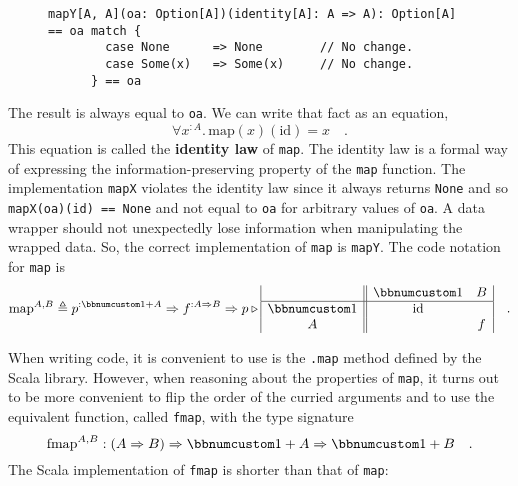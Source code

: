 \begin{wrapfigure}{l}{0.65\columnwidth}%
\vspace{-0.8\baselineskip}
\begin{lstlisting}
mapY[A, A](oa: Option[A])(identity[A]: A => A): Option[A]
== oa match {
        case None      => None        // No change.
        case Some(x)   => Some(x)     // No change.
      } == oa
\end{lstlisting}
\vspace{-1.3\baselineskip}
\end{wrapfigure}%
The result is always equal to \lstinline!oa!. We can write that fact
as an equation,
\[
\forall x^{:A}.\,\text{map}(x)(\text{id})=x\quad.
\]
This equation is called the \textbf{identity law}
of \lstinline!map!. The identity law is a formal way of expressing
the information-preserving property of the \lstinline!map! function.
The implementation \lstinline!mapX! violates the identity law since
it always returns \lstinline!None! and so \lstinline!mapX(oa)(id) == None!
and not equal to \lstinline!oa! for arbitrary values of \lstinline!oa!.
A data wrapper should not unexpectedly lose information when manipulating
the wrapped data. So, the correct implementation of \lstinline!map!
is \lstinline!mapY!. The code notation for \lstinline!map! is
\[
\text{map}^{A,B}\triangleq p^{:\bbnum 1+A}\Rightarrow f^{:A\Rightarrow B}\Rightarrow p\triangleright\begin{array}{|c||cc|}
 & \bbnum 1 & B\\
\hline \bbnum 1 & \text{id} & \\
A &  & f
\end{array}\quad.
\]

When writing code, it is convenient to use is the \lstinline!.map!
method defined by the Scala library. However, when reasoning about
the properties of \lstinline!map!, it turns out to be more convenient
to flip the order of the curried arguments and to use the equivalent
function, called \lstinline!fmap!, with the type signature
\[
\text{fmap}^{A,B}:\left(A\Rightarrow B\right)\Rightarrow\bbnum 1+A\Rightarrow\bbnum 1+B\quad.
\]
The Scala implementation of \lstinline!fmap! is shorter than that
of \lstinline!map!:

